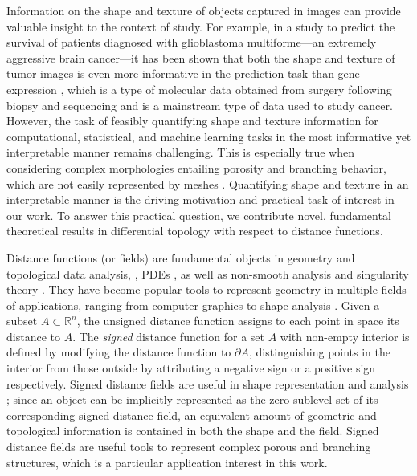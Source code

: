 \documentclass[11pt]{article}
\newcommand{\R}{\mathbb{R}}
\theoremstyle{plain}
\theoremstyle{definition}
\theoremstyle{remark}
\begin{document}
	Information on the shape and texture of objects captured in images can provide valuable insight to the context of study.  For example, in a study to predict the survival of patients diagnosed with glioblastoma multiforme---an extremely aggressive brain cancer---it has been shown that both the shape and texture of tumor images is even more informative in the prediction task than gene expression \citep{crawford2020predicting}, which is a type of molecular data obtained from surgery following biopsy and sequencing and is a mainstream type of data used to study cancer.  However, the task of feasibly quantifying shape and texture information for computational, statistical, and machine learning tasks in the most informative yet interpretable manner remains challenging.  This is especially true when considering complex morphologies entailing porosity and branching behavior, which are not easily represented by meshes \citep{song_generation_2022}. Quantifying shape and texture in an interpretable manner is the driving motivation and practical task of interest in our work.  To answer this practical question, we contribute novel, fundamental theoretical results in differential topology with respect to distance functions.
	
	Distance functions (or fields) are fundamental objects in geometry and topological data analysis, \citep{osher_signed_2003, lieutier_any_2003, chazal_stability_2004, attali_stability_2009}, PDEs \citep{albano_singular_2013}, as well as non-smooth analysis and singularity theory \citep{cheeger_critical_1991,birbrair_medial_2017}. 
	They have become popular tools to represent geometry in multiple fields of applications, ranging from computer graphics to shape analysis \citep{lee_medial_1982, lindquist_medial_1996, sigg_signed_2003, park_deepsdf_2019}.
	Given a subset $A \subset \R^n$, the unsigned distance function assigns to each point in space its distance to $A$. The \emph{signed} distance function for a set $A$ with non-empty interior is defined by modifying the distance function to $\partial A$, distinguishing points in the interior from those outside by attributing a negative sign or a positive sign respectively. Signed distance fields are useful in shape representation and analysis \citep{osher_signed_2003}; since an object can be implicitly represented as the zero sublevel set of its corresponding signed distance field, an equivalent amount of geometric and topological information is contained in both the shape and the field. Signed distance fields are useful tools to represent complex porous and branching structures, which is a particular application interest in this work. 
	
\end{document}
